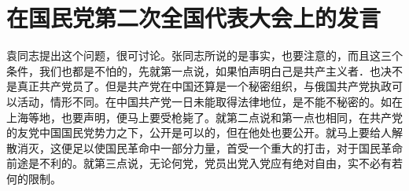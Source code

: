 \section[在国民党第二次全国代表大会上的发言（一九二五年）]{在国民党第二次全国代表大会上的发言}


袁同志提出这个问题，很可讨论。张同志所说的是事实，也要注意的，而且这三个条件，我们也都是不怕的，先就第一点说，如果怕声明白己是共产主义者．也决不是真正共产党员了。但是共产党在中国还算是一个秘密组织，与俄国共产党执政可以活动，情形不同。在中国共产党一日未能取得法律地位，是不能不秘密的。如在上海等地，也要声明，便马上要受枪毙了。就第二点说和第一点也相同，在共产党的友党中国国民党势力之下，公开是可以的，但在他处也要公开。就马上要给人解散消灭，这便足以使国民革命中一部分力量，首受一个重大的打击，对于国民革命前途是不利的。就第三点说，无论何党，党员出党入党应有绝对自由，实不必有若何的限制。

